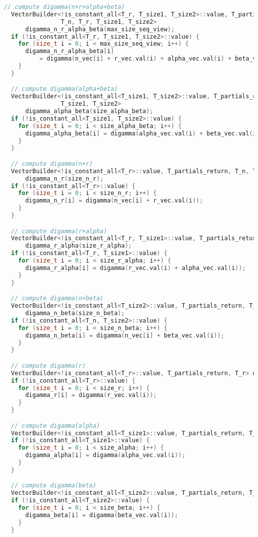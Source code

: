 \documentclass[11pt]{article}
\begin{document}
\begin{lstlisting}[language=c++, style=lgeneral]
  // compute digamma(n+r+alpha+beta)
  VectorBuilder<!is_constant_all<T_r, T_size1, T_size2>::value, T_partials_return,
                T_n, T_r, T_size1, T_size2>
      digamma_n_r_alpha_beta(max_size_seq_view);
  if (!is_constant_all<T_r, T_size1, T_size2>::value) {
    for (size_t i = 0; i < max_size_seq_view; i++) {
      digamma_n_r_alpha_beta[i]
          = digamma(n_vec[i] + r_vec.val(i) + alpha_vec.val(i) + beta_vec.val(i));
    }
  }

  // compute digamma(alpha+beta)
  VectorBuilder<!is_constant_all<T_size1, T_size2>::value, T_partials_return,
                T_size1, T_size2>
      digamma_alpha_beta(size_alpha_beta);
  if (!is_constant_all<T_size1, T_size2>::value) {
    for (size_t i = 0; i < size_alpha_beta; i++) {
      digamma_alpha_beta[i] = digamma(alpha_vec.val(i) + beta_vec.val(i));
    }
  }

  // compute digamma(n+r)
  VectorBuilder<!is_constant_all<T_r>::value, T_partials_return, T_n, T_r>
      digamma_n_r(size_n_r);
  if (!is_constant_all<T_r>::value) {
    for (size_t i = 0; i < size_n_r; i++) {
      digamma_n_r[i] = digamma(n_vec[i] + r_vec.val(i));
    }
  }

  // compute digamma(r+alpha)
  VectorBuilder<!is_constant_all<T_r, T_size1>::value, T_partials_return, T_r, T_size1>
      digamma_r_alpha(size_r_alpha);
  if (!is_constant_all<T_r, T_size1>::value) {
    for (size_t i = 0; i < size_r_alpha; i++) {
      digamma_r_alpha[i] = digamma(r_vec.val(i) + alpha_vec.val(i));
    }
  }

  // compute digamma(n+beta)
  VectorBuilder<!is_constant_all<T_size2>::value, T_partials_return, T_n, T_size2>
      digamma_n_beta(size_n_beta);
  if (!is_constant_all<T_n, T_size2>::value) {
    for (size_t i = 0; i < size_n_beta; i++) {
      digamma_n_beta[i] = digamma(n_vec[i] + beta_vec.val(i));
    }
  }

  // compute digamma(r)
  VectorBuilder<!is_constant_all<T_r>::value, T_partials_return, T_r> digamma_r(size_r);
  if (!is_constant_all<T_r>::value) {
    for (size_t i = 0; i < size_r; i++) {
      digamma_r[i] = digamma(r_vec.val(i));
    }
  }

  // compute digamma(alpha)
  VectorBuilder<!is_constant_all<T_size1>::value, T_partials_return, T_size1> digamma_alpha(size_alpha);
  if (!is_constant_all<T_size1>::value) {
    for (size_t i = 0; i < size_alpha; i++) {
      digamma_alpha[i] = digamma(alpha_vec.val(i));
    }
  }

  // compute digamma(beta)
  VectorBuilder<!is_constant_all<T_size2>::value, T_partials_return, T_size2> digamma_beta(size_beta);
  if (!is_constant_all<T_size2>::value) {
    for (size_t i = 0; i < size_beta; i++) {
      digamma_beta[i] = digamma(beta_vec.val(i));
    }
  }
\end{lstlisting}
\end{document}
